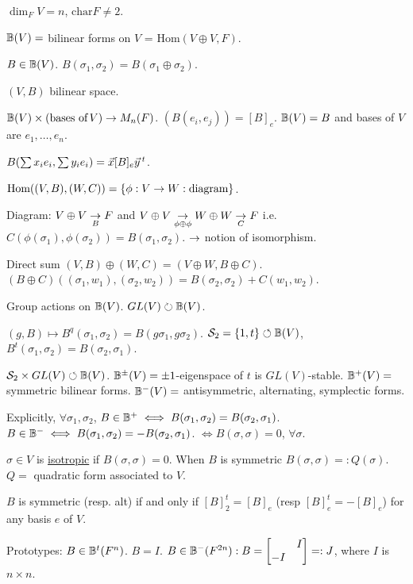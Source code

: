 \documentclass[]{article}
\begin{document}
$\dim_F V = n$, $\text{char}F\neq 2$. 

$\mathbb{B}(V) = $ bilinear forms on $V$ = $\text{Hom}(V\oplus V,F)$.

$B\in \mathbb{B}(V)$. $B(\sigma_1,\sigma_2) = B(\sigma_1\oplus \sigma_2)$.

$(V,B)$ bilinear space.

$\mathbb{B}(V) \times (\text{bases of}\,V) \rightarrow M_n(F)$. $(B(e_i,e_j)) = [B]_e$. $\mathbb{B}(V) = B$ and bases of $V$ are $e_1,\dots,e_n$.

$B(\sum x_i e_i, \sum y_i e_i) = \vec{x}[B]_e \vec{y}\,^t$.

$\text{Hom}((V,B),(W,C)) = \{\phi: V\rightarrow W: \text{diagram}\}$. 

Diagram: $V\oplus V \underset{B}{\rightarrow} F$ and $V\oplus V \underset{\phi\oplus\phi}{\rightarrow} W\oplus W \underset{C}{\rightarrow} F$ i.e. $C(\phi(\sigma_1),\phi(\sigma_2)) = B(\sigma_1,\sigma_2)$. $\rightarrow$ notion of isomorphism.

Direct sum $(V,B) \oplus (W,C) = (V\oplus W,B\oplus C)$. $(B \oplus C)((\sigma_1,w_1),(\sigma_2,w_2)) = B(\sigma_2,\sigma_2) + C(w_1,w_2)$.

Group actions on $\mathbb{B}(V)$. $GL(V) \circlearrowright \mathbb{B}(V)$.

$(g,B) \mapsto B^q(\sigma_1,\sigma_2) = B(g\sigma_1,g\sigma_2)$. $\mathcal{S}_2 = \{1,t\} \circlearrowleft \mathbb{B}(V)$, $B^t(\sigma_1,\sigma_2) = B(\sigma_2,\sigma_1)$.

$\mathcal{S}_2 \times GL(V) \circlearrowleft \mathbb{B}(V)$. $\mathbb{B}^\pm (V) = \pm 1$-eigenspace of $t$ is $GL(V)$-stable. $\mathbb{B}^+(V) = $ symmetric bilinear forms. $\mathbb{B}^-(V) = $ antisymmetric, alternating, symplectic forms.

Explicitly, $\forall \sigma_1,\sigma_2$, $B\in \mathbb{B}^+ \iff B(\sigma_1,\sigma_2) = B(\sigma_2,\sigma_1)$. $B\in \mathbb{B}^- \iff B(\sigma_1,\sigma_2) = - B(\sigma_2,\sigma_1)$. $\iff B(\sigma,\sigma) = 0$, $\forall \sigma$.

\begin{definition}
	$\sigma\in V$ is \ul{isotropic} if $B(\sigma,\sigma) = 0$. When $B$ is symmetric $B(\sigma,\sigma) =: Q(\sigma)$. $Q = $ quadratic form associated to $V$.
\end{definition}
\begin{lemma}
	$B$ is symmetric (resp. alt) if and only if $[B]_2^t = [B]_e$ (resp $[B]_e^t = - [B]_e$) for any basis $e$ of $V$.
\end{lemma}

Prototypes: $B \in \mathbb{B}^t(F^n)$. $B = I$. $B \in \mathbb{B}^-(F^{2n}): B = \begin{bmatrix} & I\\-I&\end{bmatrix} =: J$, where $I$ is $n\times n$. 
\end{document}
